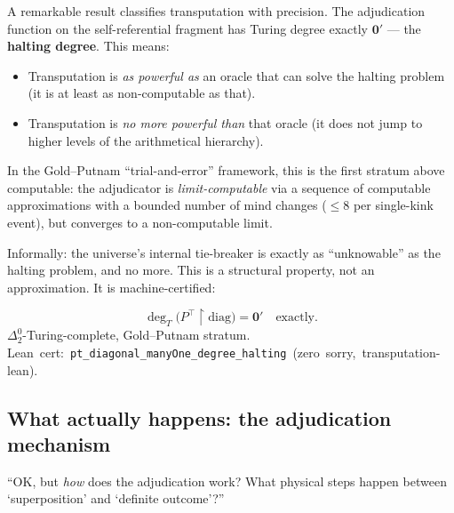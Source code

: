 \documentclass[11pt,a4paper]{article}
\newcommand{\term}[1]{\textbf{#1}}
\newcommand{\lean}[1]{\texttt{#1}}
\newcommand{\CatAL}{\textbf{CatAL}}
\begin{document}
A remarkable result classifies transputation with precision.  The adjudication
function on the self-referential fragment has Turing degree exactly $\mathbf{0}'$
--- the \term{halting degree}.  This means:

\begin{itemize}
  \item Transputation is \emph{as powerful as} an oracle that can solve the halting
    problem (it is at least as non-computable as that).
  \item Transputation is \emph{no more powerful than} that oracle (it does not
    jump to higher levels of the arithmetical hierarchy).
\end{itemize}

In the Gold--Putnam ``trial-and-error'' framework, this is the first stratum above
computable: the adjudicator is \emph{limit-computable} via a sequence of computable
approximations with a bounded number of mind changes ($\leq 8$ per single-kink event),
but converges to a non-computable limit.

Informally: the universe's internal tie-breaker is exactly as ``unknowable'' as
the halting problem, and no more.  This is a structural property, not an
approximation.  It is machine-certified:

\begin{tcolorbox}[colback=boxyellow,colframe=yellow!70!black,title=Degree-exact classification (\CatAL)]
  \[
    \deg_T\!\bigl(P^\top{\restriction}\mathrm{diag}\bigr) = \mathbf{0}'
    \quad\text{exactly.}
  \]
  $\Delta^0_2$-Turing-complete, Gold--Putnam stratum.\\
  \mbox{Lean cert: \lean{pt\_diagonal\_manyOne\_degree\_halting} (zero sorry, transputation-lean).}
\end{tcolorbox}

\subsection{What actually happens: the adjudication mechanism}
\label{subsec:mechanism}

\begin{tcolorbox}[colback=boxblue,colframe=blue!40!black,title=The reader's natural question]
``OK, but \emph{how} does the adjudication work?  What physical steps happen between
`superposition' and `definite outcome'?''
\end{tcolorbox}
\end{document}
